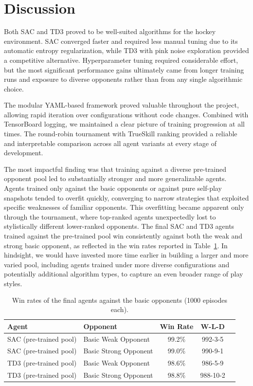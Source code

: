 \section{Discussion}
\label{sec:discussion}

Both \ac{SAC} and \ac{TD3} proved to be well-suited algorithms for the hockey environment. \ac{SAC} 
converged faster and required less manual tuning due to its automatic entropy 
regularization, while \ac{TD3} with pink noise exploration provided a competitive alternative. 
Hyperparameter tuning required considerable effort, but the most significant performance 
gains ultimately came from longer training runs and exposure to diverse opponents rather 
than from any single algorithmic choice.

The modular YAML-based framework proved valuable throughout the project, allowing rapid 
iteration over configurations without code changes. Combined with TensorBoard logging, 
we maintained a clear picture of training progression at all times. The round-robin 
tournament with TrueSkill ranking provided a reliable and interpretable comparison 
across all agent variants at every stage of development.
 
\medskip 
The most impactful finding was that training against a diverse pre-trained opponent pool 
led to substantially stronger and more generalizable agents. Agents trained only against 
the basic opponents or against pure self-play snapshots tended to overfit quickly, 
converging to narrow strategies that exploited specific weaknesses of familiar opponents. 
This overfitting became apparent only through the tournament, where top-ranked agents 
unexpectedly lost to stylistically different lower-ranked opponents. The final \ac{SAC} and 
\ac{TD3} agents trained against the pre-trained pool win consistently against both the weak 
and strong basic opponent, as reflected in the win rates reported in 
Table~\ref{tab:win_rates}. In hindsight, we would have invested 
more time earlier in building a larger and more varied pool, including agents trained 
under more diverse configurations and potentially additional algorithm types, to capture 
an even broader range of play styles.

\begin{table}[h]
\centering
\caption{Win rates of the final agents against the basic opponents (1000 episodes each).}
\vspace{-0.2cm}
\label{tab:win_rates}
\begin{tabular}{llccc}
\toprule
\textbf{Agent} & \textbf{Opponent} &\textbf{Win Rate}  & \textbf{W-L-D} \\
\midrule
SAC (pre-trained pool)  & Basic Weak Opponent   & 99.2\% & 992-3-5   \\
SAC (pre-trained pool)  & Basic Strong Opponent & 99.0\% & 990-9-1   \\
TD3 (pre-trained pool)  & Basic Weak Opponent   & 98.6\% & 986-5-9   \\
TD3 (pre-trained pool)  & Basic Strong Opponent & 98.8\% & 988-10-2  \\
\bottomrule
\end{tabular}
\end{table}

